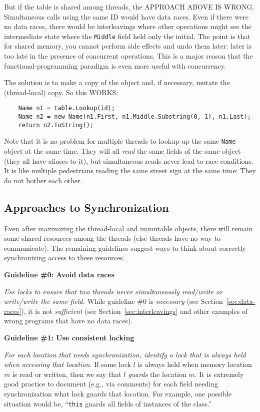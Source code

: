 \documentclass[10pt]{article}
\begin{document}
But if the table is shared among threads, the APPROACH ABOVE IS WRONG.
Simultaneous calls using the same ID would have data races.  Even if
there were no data races, there would be interleavings where other
operations might see the intermediate state where the {\tt Middle}
field held only the initial.  The point is that for shared memory, you
cannot perform side effects and undo them later: later is too late in the
presence of concurrent operations.  This is a major reason that the
functional-programming paradigm is even more useful with concurrency.

The solution is to make a copy of the object and, if necessary, mutate the
(thread-local) copy.  So this WORKS:
\begin{verbatim}
    Name n1 = table.Lookup(id);
    Name n2 = new Name(n1.First, n1.Middle.Substring(0, 1), n1.Last);
    return n2.ToString();
\end{verbatim}

Note that it is no problem for multiple threads to lookup up the same
{\tt Name} object at the same time.  They will all \emph{read} the same
fields of the same object (they all have aliases to it), but
simultaneous reads never lead to race conditions.  It is like
multiple pedestrians reading the same street sign at the same time:
They do not bother each other.

\subsection{Approaches to Synchronization}

Even after maximizing the thread-local and immutable objects, there
will remain some shared resources among the threads (else threads have
no way to communicate).  The remaining guidelines suggest ways to
think about correctly synchronizing access to these resources.

\medskip
\noindent\textbf{Guideline \#0: Avoid data races}  
\medskip

\emph{Use locks to ensure that two threads never simultaneously
  read/write or write/write the same field.}  While guideline \#0 is
\emph{necessary} (see Section~\ref{sec:data-races}), it is not
\emph{sufficient} (see Section~\ref{sec:interleavings} and other
examples of wrong programs that have no data races).

\medskip
\noindent\textbf{Guideline \#1: Use consistent locking}  
\medskip

\emph{For each location that needs synchronization, identify a lock
  that is always held when accessing that location.}  If some lock $l$
  is always held when memory location $m$ is read or written, then we
  say that $l$ \emph{guards} the location $m$.  It is extremely good
  practice to document (e.g., via comments) for each field needing
  synchronization what lock guards that location.  For example, one
  possible situation would be, ``{\tt this} guards all
  fields of instances of the class.''
\end{document}
